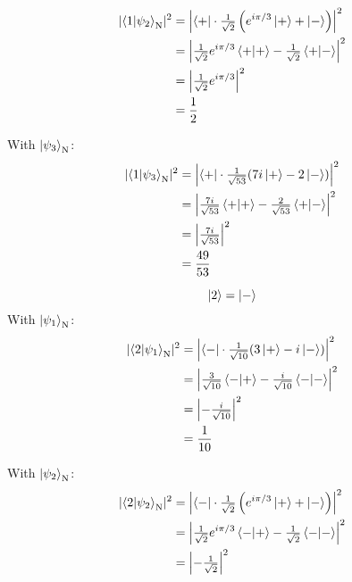 \documentclass[11pt]{article}
\newcommand\abs[1]{\lvert#1\rvert}
\newcommand\Abs[1]{\left\lvert#1\right\rvert}
\begin{document}
\begin{enumerate}[label=\textbf{\arabic*.}, start=2]
{\begin{enumerate}[label=\textbf{(\alph*)}]
{\begin{align*}
                        \abs{\braket{1|\psi_2}_\mathrm{N}}^2&=\Abs{\bra{+}\cdot\tfrac{1}{\sqrt 2}\left(e^{i\pi/3}\ket{+}+\ket{-}\right)}^2 \\
                        &=\Abs{\tfrac{1}{\sqrt 2}e^{i\pi/3}\braket{+|+}-\tfrac{1}{\sqrt 2}\braket{+|-}}^2 \\
                        &=\Abs{\tfrac{1}{\sqrt 2}e^{i\pi/3}}^2 \\
                        &=\frac{1}{2}
                    \end{align*}
                    \par
                    With \(\ket{\psi_3}_\mathrm{N}\):
                    \begin{align*}
                        \abs{\braket{1|\psi_3}_\mathrm{N}}^2&=\Abs{\bra{+}\cdot\tfrac{1}{\sqrt{53}}(7i\ket{+}-2\ket{-})}^2 \\
                        &=\Abs{\tfrac{7i}{\sqrt{53}}\braket{+|+}-\tfrac{2}{\sqrt{53}}\braket{+|-}}^2 \\
                        &=\Abs{\tfrac{7i}{\sqrt{53}}}^2 \\
                        &=\frac{49}{53}
                    \end{align*}
                    \par
                    {\boldmath \[\ket{2}=\ket{-}\]}
                    With \(\ket{\psi_1}_\mathrm{N}\):
                    \begin{align*}
                        \abs{\braket{2|\psi_1}_\mathrm{N}}^2&=\Abs{\bra{-}\cdot\tfrac{1}{\sqrt{10}}(3\ket{+}-i\ket{-})}^2 \\
                        &=\Abs{\tfrac{3}{\sqrt{10}}\braket{-|+}-\tfrac{i}{\sqrt{10}}\braket{-|-}}^2 \\
                        &=\Abs{-\tfrac{i}{\sqrt{10}}}^2 \\
                        &=\frac{1}{10}
                    \end{align*}
                    \par
                    With \(\ket{\psi_2}_\mathrm{N}\):
                    \begin{align*}
                        \abs{\braket{2|\psi_2}_\mathrm{N}}^2&=\Abs{\bra{-}\cdot\tfrac{1}{\sqrt 2}\left(e^{i\pi/3}\ket{+}+\ket{-}\right)}^2 \\
                        &=\Abs{\tfrac{1}{\sqrt 2}e^{i\pi/3}\braket{-|+}-\tfrac{1}{\sqrt 2}\braket{-|-}}^2 \\
                        &=\Abs{-\tfrac{1}{\sqrt 2}}^2 \\

\end{align*}}
\end{enumerate}}
\end{enumerate}
\end{document}
